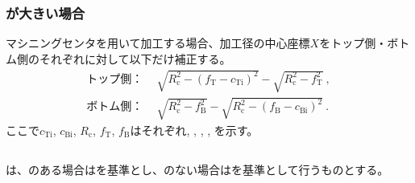 \subsubsection{\EndFaceInCChamferLength が大きい場合}
マシニングセンタを用いて加工する場合、加工径の中心座標$X$をトップ側・ボトム側のそれぞれに対して以下だけ補正する。
\begin{align*}
  \text{トップ側：}&~~
  \sqrt{R_\mathrm c^2-\left(f_\mathrm T-c_\mathrm{Ti}\right)^2}-\sqrt{R_\mathrm c^2-f_\mathrm T^2}\ ,\\
  \text{ボトム側：}&~~
  \sqrt{R_\mathrm c^2-f_\mathrm B^2}-\sqrt{R_\mathrm c^2-\left(f_\mathrm B-c_\mathrm{Bi}\right)^2}\ .
\end{align*}
ここで$c_\mathrm{Ti}$, $c_\mathrm{Bi}$, $R_\mathrm c$, $f_\mathrm T$, $f_\mathrm B$はそれぞれ\TopEndFaceInCChamferLength, \BottomEndFaceInCChamferLength, \CenterCurvatureRadius, \TopAlocationLength, \BottomAlocationLength を示す。



\clearpage


\subsection{\EndFaceRChamferMillingReferencePoint}

\subsubsection{\EndFaceOutRChamferMillingReferencePoint}
\EndFaceOutRChamferMillingReferencePoint は、\Outcut のある場合は\OutcutCenter を基準とし、\Outcut のない場合は\EndFaceIDCenter を基準として行うものとする。

